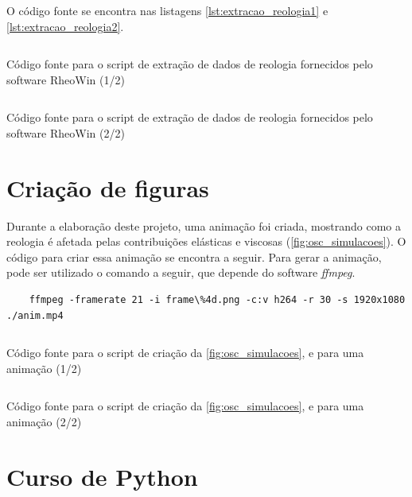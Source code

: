 \begin{apendicesenv}
O código fonte se encontra nas listagens \ref{lst:extracao_reologia1} e \ref{lst:extracao_reologia2}.

\begin{listing}[h]
	\inputminted{python}{./python/extracao_reologia1.py}
	\caption{Código fonte para o script de extração de dados de reologia fornecidos pelo software RheoWin (1/2)}  
	\label{lst:extracao_reologia1}
\end{listing}

\begin{listing}[h]
	\inputminted{python}{./python/extracao_reologia2.py}
	\caption{Código fonte para o script de extração de dados de reologia fornecidos pelo software RheoWin (2/2)} 
	\label{lst:extracao_reologia2}
\end{listing}

\FloatBarrier

\chapter{Criação de figuras}

Durante a elaboração deste projeto, uma animação foi criada, mostrando como a reologia é afetada pelas contribuições elásticas e viscosas (\autoref{fig:osc_simulacoes}). O código para criar essa animação se encontra a seguir. Para gerar a animação, pode ser utilizado o comando a seguir, que depende do software \emph{ffmpeg}.

\begin{small}
\begin{verbatim}
	ffmpeg -framerate 21 -i frame\%4d.png -c:v h264 -r 30 -s 1920x1080 ./anim.mp4
\end{verbatim}
\end{small}

\begin{listing}[H]
	\inputminted{python}{./python/grafico_reologia_oscilatoria.py}
	\caption{Código fonte para o script de criação da \autoref{fig:osc_simulacoes}, e para uma animação (1/2)}  
	\label{lst:oscilatorio_animacao1}
\end{listing}
\FloatBarrier
\begin{listing}[h]
	\inputminted{python}{./python/grafico_reologia_oscilatoria2.py}
	\caption{Código fonte para o script de criação da \autoref{fig:osc_simulacoes}, e para uma animação (2/2)} 
	\label{lst:oscilatorio_animacao2}
\end{listing}


\chapter{Curso de Python}


\end{apendicesenv}
